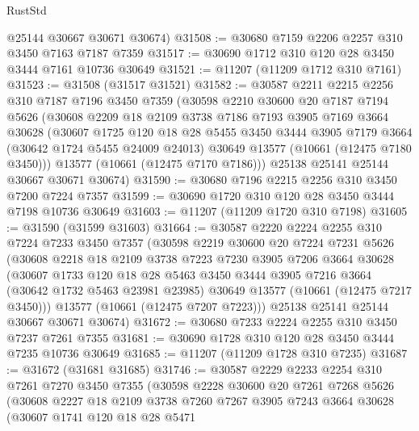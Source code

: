 \begin{lexlean}{RustStd}
\begin{coremodule}
      @25144
      @30667
      @30671
      @30674)
@31508 := @30680 @7159 @2206 @2257 @310 @3450 @7163 @7187 @7359
@31517 := @30690 @1712 @310 @120 @28 @3450 @3444 @7161 @10736 @30649
@31521 := @11207 (@11209 @1712 @310 @7161)
@31523 := @31508 (@31517 @31521)
@31582 := @30587
    @2211
    @2215
    @2256
    @310
    @7187
    @7196
    @3450
    @7359
    (@30598
      @2210
      @30600
      @20
      @7187
      @7194
      @5626
      (@30608
        @2209
        @18
        @2109
        @3738
        @7186
        @7193
        @3905
        @7169
        @3664
        @30628
        (@30607
          @1725
          @120
          @18
          @28
          @5455
          @3450
          @3444
          @3905
          @7179
          @3664
          (@30642 @1724 @5455 @24009 @24013)
          @30649
          @13577
          (@10661 (@12475 @7180 @3450)))
        @13577
        (@10661 (@12475 @7170 @7186)))
      @25138
      @25141
      @25144
      @30667
      @30671
      @30674)
@31590 := @30680 @7196 @2215 @2256 @310 @3450 @7200 @7224 @7357
@31599 := @30690 @1720 @310 @120 @28 @3450 @3444 @7198 @10736 @30649
@31603 := @11207 (@11209 @1720 @310 @7198)
@31605 := @31590 (@31599 @31603)
@31664 := @30587
    @2220
    @2224
    @2255
    @310
    @7224
    @7233
    @3450
    @7357
    (@30598
      @2219
      @30600
      @20
      @7224
      @7231
      @5626
      (@30608
        @2218
        @18
        @2109
        @3738
        @7223
        @7230
        @3905
        @7206
        @3664
        @30628
        (@30607
          @1733
          @120
          @18
          @28
          @5463
          @3450
          @3444
          @3905
          @7216
          @3664
          (@30642 @1732 @5463 @23981 @23985)
          @30649
          @13577
          (@10661 (@12475 @7217 @3450)))
        @13577
        (@10661 (@12475 @7207 @7223)))
      @25138
      @25141
      @25144
      @30667
      @30671
      @30674)
@31672 := @30680 @7233 @2224 @2255 @310 @3450 @7237 @7261 @7355
@31681 := @30690 @1728 @310 @120 @28 @3450 @3444 @7235 @10736 @30649
@31685 := @11207 (@11209 @1728 @310 @7235)
@31687 := @31672 (@31681 @31685)
@31746 := @30587
    @2229
    @2233
    @2254
    @310
    @7261
    @7270
    @3450
    @7355
    (@30598
      @2228
      @30600
      @20
      @7261
      @7268
      @5626
      (@30608
        @2227
        @18
        @2109
        @3738
        @7260
        @7267
        @3905
        @7243
        @3664
        @30628
        (@30607
          @1741
          @120
          @18
          @28
          @5471

\end{coremodule}
\end{lexlean}
